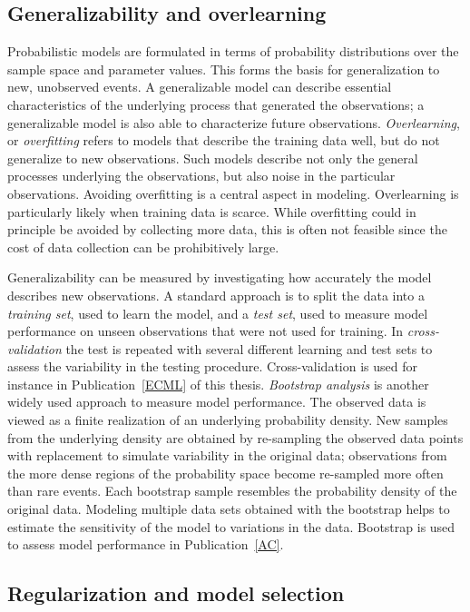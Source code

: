 \subsection{Generalizability and overlearning}\label{sec:generalizability}

Probabilistic models are formulated in terms of probability
distributions over the sample space and parameter values. This forms
the basis for generalization to new, unobserved events. A
generalizable model can describe essential characteristics of the
underlying process that generated the observations; a generalizable
model is also able to characterize future observations. {\it
  Overlearning}, or {\it overfitting} refers to models that describe
the training data well, but do not generalize to new
observations. Such models describe not only the general processes
underlying the observations, but also noise in the particular
observations. Avoiding overfitting is a central aspect in modeling.
Overlearning is particularly likely when training data is scarce. While
overfitting could in principle be avoided by collecting more data,
this is often not feasible since the cost of data collection can be
prohibitively large.

Generalizability can be measured by investigating how accurately the
model describes new observations.  A standard approach is to split the
data into a {\it training set}, used to learn the model, and a {\it
  test set}, used to measure model performance on unseen observations
that were not used for training. In \emph{cross-validation} the test
is repeated with several different learning and test sets to assess
the variability in the testing procedure.  Cross-validation is used
for instance in Publication~\ref{ECML} of this thesis. \emph{Bootstrap
  analysis} \citep[see, for instance,][]{Efron94} is another widely
used approach to measure model performance. The observed data is
viewed as a finite realization of an underlying probability
density. New samples from the underlying density are obtained by
re-sampling the observed data points with replacement to simulate
variability in the original data; observations from the more dense
regions of the probability space become re-sampled more often than
rare events. Each bootstrap sample resembles the probability density
of the original data. Modeling multiple data sets obtained with the
bootstrap helps to estimate the sensitivity of the model to variations
in the data. Bootstrap is used to assess model performance in
Publication~\ref{AC}.

\subsection{Regularization and model selection}

